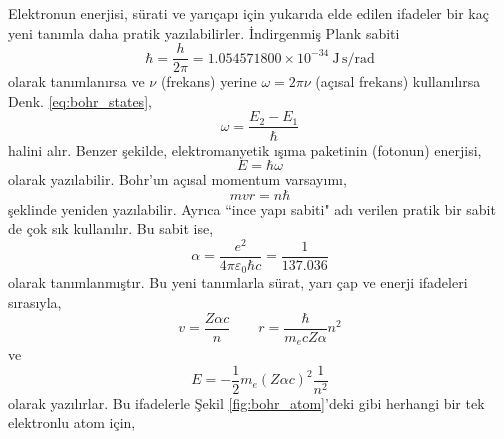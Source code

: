 \documentclass[a4paper,12pt, twoside]{article}
\begin{document}
Elektronun enerjisi, sürati ve yarıçapı için yukarıda elde edilen ifadeler bir kaç yeni tanımla daha pratik yazılabilirler. İndirgenmiş Plank sabiti 
\begin{equation}
\hbar = \frac{h}{2\pi} = 1.054571800 \times 10^{-34}\ \text{J}\,\text{s}/\text{rad}
\label{eq:reduced_planck_const}
\end{equation}
olarak tanımlanırsa ve $\nu$ (frekans) yerine $\omega = 2\pi \nu$ (açısal frekans) kullanılırsa Denk. \ref{eq:bohr_states}, 
\begin{equation}
\omega = \frac{E_2 - E_1}{\hbar}
\label{eq:bohr_states_2pi}
\end{equation}
halini alır. Benzer şekilde, elektromanyetik ışıma paketinin (fotonun) enerjisi,
\begin{equation}
E = \hbar \omega
\label{eq:foton_energy_2pi}
\end{equation}
olarak yazılabilir. Bohr'un açısal momentum varsayımı,
\begin{equation}
m v r = n \hbar
\label{eq:bohr_allowed_states_2pi}
\end{equation}
şeklinde yeniden yazılabilir. Ayrıca ``ince yapı sabiti" adı verilen pratik bir sabit de çok sık kullanılır. Bu sabit ise,
\begin{equation}
\alpha = \frac{e^2}{4\pi\varepsilon_0\hbar c} =\frac{1}{137.036}
\label{eq:fine_structure_const}
\end{equation}
olarak tanımlanmıştır. Bu yeni tanımlarla sürat, yarı çap ve enerji ifadeleri sırasıyla,
\begin{equation}
v = \frac{Z \alpha c}{n} \hspace{24pt} r = \frac{\hbar}{m_e c Z \alpha} n^2
\label{eq:bohr_v_r_2pi}
\end{equation}
ve
\begin{equation}
E = -\frac{1}{2}m_e (Z \alpha c)^2 \frac{1}{n^2}
\label{eq:bohr_E_2pi}
\end{equation}
olarak yazılırlar. Bu ifadelerle Şekil \ref{fig:bohr_atom}'deki gibi herhangi bir tek elektronlu atom için,
\end{document}
